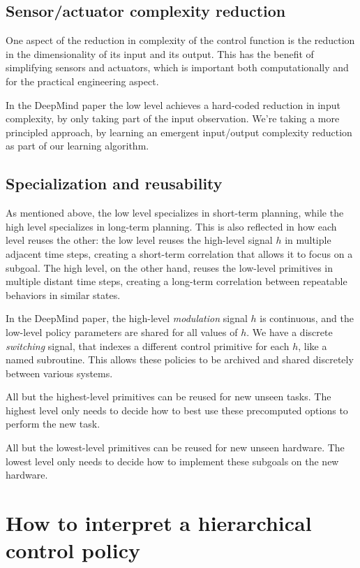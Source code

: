 \subsection{Sensor/actuator complexity reduction}

One aspect of the reduction in complexity of the control function is the reduction in the dimensionality of its input and its output.
This has the benefit of simplifying sensors and actuators, which is important both computationally and for the practical engineering aspect.

In the DeepMind paper the low level achieves a hard-coded reduction in input complexity, by only taking part of the input observation.
We're taking a more principled approach, by learning an emergent input/output complexity reduction as part of our learning algorithm.

\subsection{Specialization and reusability}

As mentioned above, the low level specializes in short-term planning, while the high level specializes in long-term planning.
This is also reflected in how each level reuses the other: the low level reuses the high-level signal $h$ in multiple adjacent time steps, creating a short-term correlation that allows it to focus on a subgoal.
The high level, on the other hand, reuses the low-level primitives in multiple distant time steps, creating a long-term correlation between repeatable behaviors in similar states.

In the DeepMind paper, the high-level \emph{modulation} signal $h$ is continuous, and the low-level policy parameters are shared for all values of $h$.
We have a discrete \emph{switching} signal, that indexes a different control primitive for each $h$, like a named subroutine.
This allows these policies to be archived and shared discretely between various systems.

All but the highest-level primitives can be reused for new unseen tasks.
The highest level only needs to decide how to best use these precomputed options to perform the new task.

All but the lowest-level primitives can be reused for new unseen hardware.
The lowest level only needs to decide how to implement these subgoals on the new hardware.

\section{How to interpret a hierarchical control policy}

